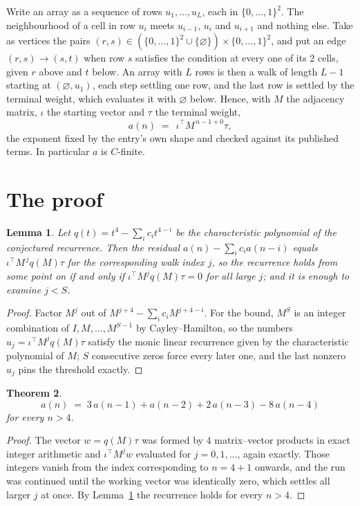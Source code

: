 \documentclass[11pt,a4paper]{article}
\theoremstyle{plain}
\newtheorem{theorem}{Theorem}
\newtheorem{lemma}[theorem]{Lemma}
\theoremstyle{definition}
\begin{document}
Write an array as a sequence of rows $u_1,\dots,u_L$, each in
$\{0,\dots,1\}^{2}$. The neighbourhood of a cell in row $u_i$ meets $u_{i-1}$,
$u_i$ and $u_{i+1}$ and nothing else. Take as vertices the pairs
$(r,s)\in(\{0,\dots,1\}^{2}\cup\{\varnothing\})\times\{0,\dots,1\}^{2}$,
and put an edge $(r,s)\to(s,t)$ when row $s$ satisfies the condition at every one of its
$2$ cells, given $r$ above and $t$ below. An array with $L$ rows is then a walk of length
$L-1$ starting at $(\varnothing,u_1)$, each step settling one row, and the last row is
settled by the terminal weight, which evaluates it with $\varnothing$ below. Hence,
with $M$ the adjacency matrix, $\iota$ the starting vector and $\tau$ the terminal weight,
\[
a(n)\;=\;\,\iota^{\!\top}M^{\,n-1+0}\tau ,
\]
the exponent fixed by the entry's own shape and checked against its published terms. In
particular $a$ is $C$-finite.

\section{The proof}

\begin{lemma}\label{lem:crit}
Let $q(t)=t^{4}-\sum_i c_it^{4-i}$ be the characteristic polynomial of the
conjectured recurrence. Then the residual $a(n)-\sum_ic_ia(n-i)$ equals
$\iota^{\!\top}M^{\,j}q(M)\tau$ for the corresponding walk index $j$, so the
recurrence holds from some point on if and only if $\iota^{\!\top}M^{j}q(M)\tau=0$ for all
large $j$; and it is enough to examine $j<S$.
\end{lemma}

\begin{proof}
Factor $M^{j}$ out of $M^{j+4}-\sum_ic_iM^{j+4-i}$. For the bound, $M^{S}$
is an integer combination of $I,M,\dots,M^{S-1}$ by Cayley--Hamilton, so the numbers
$u_j=\iota^{\!\top}M^{j}q(M)\tau$ satisfy the monic linear recurrence given by the
characteristic polynomial of $M$; $S$ consecutive zeros force every later one, and the last
nonzero $u_j$ pins the threshold exactly.
\end{proof}

\begin{theorem}
\[
a(n)\;=\;3\,a(n-1) + a(n-2) + 2\,a(n-3) - 8\,a(n-4)
\]
for every $n>4$.
\end{theorem}

\begin{proof}
The vector $w=q(M)\tau$ was formed by $4$ matrix--vector products in exact integer
arithmetic and $\iota^{\!\top}M^{j}w$ evaluated for $j=0,1,\dots$, again exactly. Those
integers vanish from the index corresponding to $n=4+1$ onwards, and the run was
continued until the working vector was identically zero, which settles all larger $j$ at once.
By Lemma~\ref{lem:crit} the recurrence holds for every $n>4$.
\end{proof}
\end{document}
